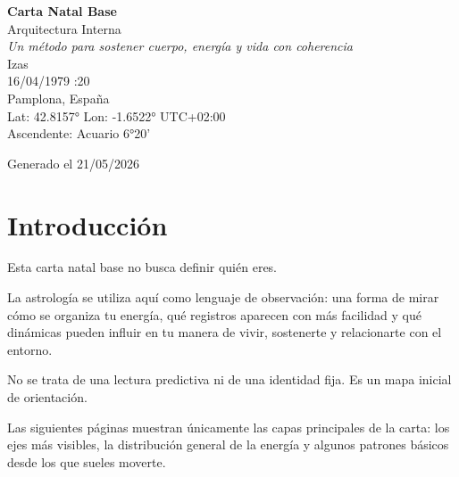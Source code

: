 \documentclass[11pt,a4paper]{article}
\begin{document}

\begin{titlepage}

\centering

\vspace*{1.5cm}

{\Huge\bfseries\color{azulai} Carta Natal Base}\\[0.5cm]

{\large\color{grisai} Arquitectura Interna}\\[0.4cm]

{\small\itshape\color{grisai}
Un método para sostener cuerpo, energía y vida con coherencia
}\\[2cm]

{\huge\color{doradoai} Izas}\\[1.5cm]

{\Large 16/04/1979 :20}\\[0.3cm]

{\Large Pamplona, España}\\[0.3cm]

{\normalsize
Lat: 42.8157° \quad
Lon: -1.6522° \quad
UTC+02:00
}\\[0.5cm]

{\normalsize
Ascendente: Acuario 6°20'
}\\[2.5cm]

\vfill

{\small Generado el 21/05/2026}

\end{titlepage}



\section*{Introducción}

Esta carta natal base no busca definir quién eres.

La astrología se utiliza aquí como lenguaje de observación:
una forma de mirar cómo se organiza tu energía,
qué registros aparecen con más facilidad
y qué dinámicas pueden influir en tu manera de vivir, sostenerte y relacionarte con el entorno.

No se trata de una lectura predictiva ni de una identidad fija.
Es un mapa inicial de orientación.

Las siguientes páginas muestran únicamente las capas principales de la carta:
los ejes más visibles,
la distribución general de la energía
y algunos patrones básicos desde los que sueles moverte.
\end{document}
